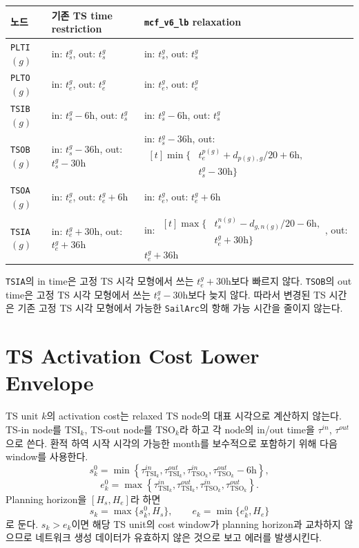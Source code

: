 \documentclass[11pt]{article}
\begin{document}
\begin{center}
\renewcommand{\arraystretch}{1.2}
\begin{tabularx}{\textwidth}{@{}p{}XX@{}}
\toprule
노드 & 기존 TS time restriction & \texttt{mcf\_v6\_lb} relaxation \\
\midrule
\texttt{PLTI}$(g)$
& in: $t^g_s$, out: $t^g_s$
& in: $t^g_s$, out: $t^g_s$ \\
\addlinespace
\texttt{PLTO}$(g)$
& in: $t^g_e$, out: $t^g_e$
& in: $t^g_e$, out: $t^g_e$ \\
\addlinespace
\texttt{TSIB}$(g)$
& in: $t^g_s-6\mathrm{h}$, out: $t^g_s$
& in: $t^g_s-6\mathrm{h}$, out: $t^g_s$ \\
\addlinespace
\texttt{TSOB}$(g)$
& in: $t^g_s-36\mathrm{h}$, out: $t^g_s-30\mathrm{h}$
& in: $t^g_s-36\mathrm{h}$,
  out:
  $\begin{aligned}[t]
    \min\{&t^{p(g)}_e+d_{p(g),g}/20+6\mathrm{h},\\
           &t^g_s-30\mathrm{h}\}
  \end{aligned}$ \\
\addlinespace
\texttt{TSOA}$(g)$
& in: $t^g_e$, out: $t^g_e+6\mathrm{h}$
& in: $t^g_e$, out: $t^g_e+6\mathrm{h}$ \\
\addlinespace
\texttt{TSIA}$(g)$
& in: $t^g_e+30\mathrm{h}$, out: $t^g_e+36\mathrm{h}$
& in:
  $\begin{aligned}[t]
    \max\{&t^{n(g)}_s-d_{g,n(g)}/20-6\mathrm{h},\\
           &t^g_e+30\mathrm{h}\}
  \end{aligned}$,
  out: $t^g_e+36\mathrm{h}$ \\
\bottomrule
\end{tabularx}
\end{center}

\texttt{TSIA}의 in time은 고정 TS 시각 모형에서 쓰는 $t^g_e+30\mathrm{h}$보다
빠르지 않다. \texttt{TSOB}의 out time은 고정 TS 시각 모형에서 쓰는
$t^g_s-30\mathrm{h}$보다 늦지 않다. 따라서 변경된 TS 시간은 기존 고정 TS 시각
모형에서 가능한 \texttt{SailArc}의 항해 가능 시간을 줄이지 않는다.

\section{TS Activation Cost Lower Envelope}

TS unit $k$의 activation cost는 relaxed TS node의 대표 시각으로 계산하지 않는다.
TS-in node를 $\mathrm{TSI}_k$, TS-out node를 $\mathrm{TSO}_k$라 하고 각 node의
in/out time을 $\tau^{in}$, $\tau^{out}$으로 쓴다. 환적 하역 시작 시각의 가능한
month를 보수적으로 포함하기 위해 다음 window를 사용한다.
\[
  s_k^0 =
  \min\left\{
    \tau^{in}_{\mathrm{TSI}_k},
    \tau^{out}_{\mathrm{TSI}_k},
    \tau^{in}_{\mathrm{TSO}_k},
    \tau^{out}_{\mathrm{TSO}_k}-6\mathrm{h}
  \right\},
\]
\[
  e_k^0 =
  \max\left\{
    \tau^{in}_{\mathrm{TSI}_k},
    \tau^{out}_{\mathrm{TSI}_k},
    \tau^{in}_{\mathrm{TSO}_k},
    \tau^{out}_{\mathrm{TSO}_k}
  \right\}.
\]
Planning horizon을 $[H_s,H_e]$라 하면
\[
  s_k = \max\{s_k^0,H_s\},\qquad
  e_k = \min\{e_k^0,H_e\}
\]
로 둔다. $s_k>e_k$이면 해당 TS unit의 cost window가 planning horizon과 교차하지
않으므로 네트워크 생성 데이터가 유효하지 않은 것으로 보고 에러를 발생시킨다.
\end{document}
